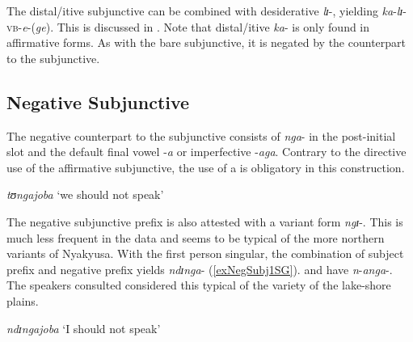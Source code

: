 The distal/itive subjunctive can be combined with desiderative \textit{lɪ}-, yielding \textit{ka}-\textit{lɪ}-\textsc{vb}-\textit{e}-(\textit{ge}). This is discussed in . Note that distal/itive \textit{ka}- is only found in affirmative forms. As with the bare subjunctive, it is negated by the  counterpart to the subjunctive.
\subsection{Negative Subjunctive}\label{NegativeSubjunctive}
The negative counterpart to the subjunctive consists of \textit{nga}- in the post-initial slot and the default final vowel -\textit{a} or imperfective -\textit{aga}. Contrary to the directive use of the affirmative subjunctive, the use of a  is obligatory in this construction.
\begin{exe}
\ex \textit{tʊngajoba} \lq we should not speak'
\end{exe}

The negative subjunctive prefix is also attested with a variant form \textit{ngɪ}-. This is much less frequent in the data and seems to be typical of the more northern variants of Nyakyusa. With the first person singular, the combination of subject prefix and negative prefix yields \textit{ndɪnga}- (\ref{exNegSubj1SG}). \citet[34f]{SchumannK1899} and \citet[73f]{EndemannC1914} have \textit{n}-\textit{anga}-. The speakers consulted considered this typical of the variety of the lake-shore plains.

\begin{exe}
\ex \label{exNegSubj1SG} \textit{ndɪngajoba} \lq I should not speak'
\end{exe}

